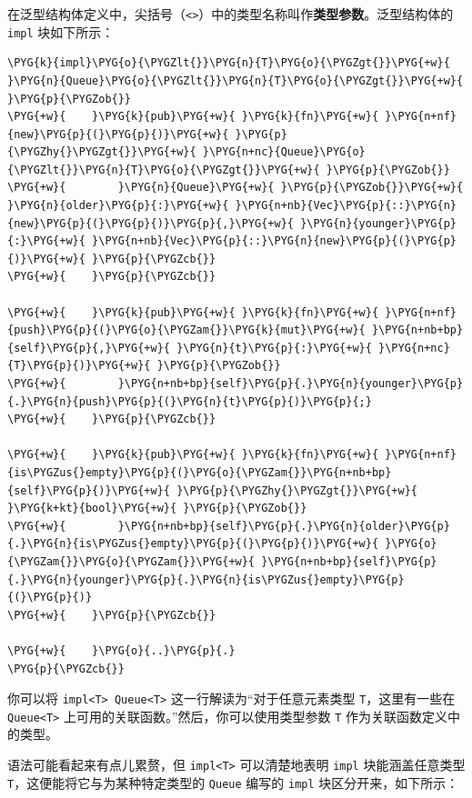 在泛型结构体定义中，尖括号（\texttt{<>}）中的类型名称叫作\textbf{类型参数}。泛型结构体的 \texttt{impl} 块如下所示：

\begin{Verbatim}[commandchars=\\\{\},breaklines=true,breakanywhere=true,fontsize=\codefont,xleftmargin=17bp]
\PYG{k}{impl}\PYG{o}{\PYGZlt{}}\PYG{n}{T}\PYG{o}{\PYGZgt{}}\PYG{+w}{ }\PYG{n}{Queue}\PYG{o}{\PYGZlt{}}\PYG{n}{T}\PYG{o}{\PYGZgt{}}\PYG{+w}{ }\PYG{p}{\PYGZob{}}
\PYG{+w}{    }\PYG{k}{pub}\PYG{+w}{ }\PYG{k}{fn}\PYG{+w}{ }\PYG{n+nf}{new}\PYG{p}{(}\PYG{p}{)}\PYG{+w}{ }\PYG{p}{\PYGZhy{}\PYGZgt{}}\PYG{+w}{ }\PYG{n+nc}{Queue}\PYG{o}{\PYGZlt{}}\PYG{n}{T}\PYG{o}{\PYGZgt{}}\PYG{+w}{ }\PYG{p}{\PYGZob{}}
\PYG{+w}{        }\PYG{n}{Queue}\PYG{+w}{ }\PYG{p}{\PYGZob{}}\PYG{+w}{ }\PYG{n}{older}\PYG{p}{:}\PYG{+w}{ }\PYG{n+nb}{Vec}\PYG{p}{::}\PYG{n}{new}\PYG{p}{(}\PYG{p}{)}\PYG{p}{,}\PYG{+w}{ }\PYG{n}{younger}\PYG{p}{:}\PYG{+w}{ }\PYG{n+nb}{Vec}\PYG{p}{::}\PYG{n}{new}\PYG{p}{(}\PYG{p}{)}\PYG{+w}{ }\PYG{p}{\PYGZcb{}}
\PYG{+w}{    }\PYG{p}{\PYGZcb{}}

\PYG{+w}{    }\PYG{k}{pub}\PYG{+w}{ }\PYG{k}{fn}\PYG{+w}{ }\PYG{n+nf}{push}\PYG{p}{(}\PYG{o}{\PYGZam{}}\PYG{k}{mut}\PYG{+w}{ }\PYG{n+nb+bp}{self}\PYG{p}{,}\PYG{+w}{ }\PYG{n}{t}\PYG{p}{:}\PYG{+w}{ }\PYG{n+nc}{T}\PYG{p}{)}\PYG{+w}{ }\PYG{p}{\PYGZob{}}
\PYG{+w}{        }\PYG{n+nb+bp}{self}\PYG{p}{.}\PYG{n}{younger}\PYG{p}{.}\PYG{n}{push}\PYG{p}{(}\PYG{n}{t}\PYG{p}{)}\PYG{p}{;}
\PYG{+w}{    }\PYG{p}{\PYGZcb{}}

\PYG{+w}{    }\PYG{k}{pub}\PYG{+w}{ }\PYG{k}{fn}\PYG{+w}{ }\PYG{n+nf}{is\PYGZus{}empty}\PYG{p}{(}\PYG{o}{\PYGZam{}}\PYG{n+nb+bp}{self}\PYG{p}{)}\PYG{+w}{ }\PYG{p}{\PYGZhy{}\PYGZgt{}}\PYG{+w}{ }\PYG{k+kt}{bool}\PYG{+w}{ }\PYG{p}{\PYGZob{}}
\PYG{+w}{        }\PYG{n+nb+bp}{self}\PYG{p}{.}\PYG{n}{older}\PYG{p}{.}\PYG{n}{is\PYGZus{}empty}\PYG{p}{(}\PYG{p}{)}\PYG{+w}{ }\PYG{o}{\PYGZam{}}\PYG{o}{\PYGZam{}}\PYG{+w}{ }\PYG{n+nb+bp}{self}\PYG{p}{.}\PYG{n}{younger}\PYG{p}{.}\PYG{n}{is\PYGZus{}empty}\PYG{p}{(}\PYG{p}{)}
\PYG{+w}{    }\PYG{p}{\PYGZcb{}}

\PYG{+w}{    }\PYG{o}{..}\PYG{p}{.}
\PYG{p}{\PYGZcb{}}
\end{Verbatim}

你可以将 \texttt{impl<T> Queue<T>} 这一行解读为“对于任意元素类型 \texttt{T}，这里有一些在 \texttt{Queue<T>} 上可用的关联函数。”然后，你可以使用类型参数 \texttt{T} 作为关联函数定义中的类型。

语法可能看起来有点儿累赘，但 \texttt{impl<T>} 可以清楚地表明 \texttt{impl} 块能涵盖任意类型 \texttt{T}，这便能将它与为某种特定类型的 \texttt{Queue} 编写的 \texttt{impl} 块区分开来，如下所示：

